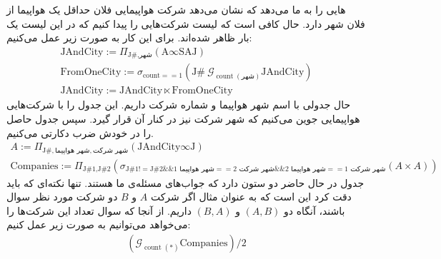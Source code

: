 \begin{enumerate}
    هایی
    را به ما می‌دهد که نشان می‌دهد شرکت هواپیمایی فلان حداقل یک هواپیما از فلان شهر دارد.
    حال کافی است که لیست شرکت‌هایی را پیدا کنیم که در این لیست یک بار ظاهر شده‌اند.
    برای این کار به صورت زیر عمل می‌کنیم:
    \begin{gather*}
        \text{JAndCity} := \Pi_{\text{J\#}, \text{شهر}} (\text{A} \infty \text{SAJ})\\
        \text{FromOneCity} := \sigma_{\text{count} == 1} (\text{J\#} ~ \mathcal{G}_{\operatorname{count}(\text{شهر})} \text{JAndCity})\\
        \text{JAndCity} := \text{JAndCity} \ltimes \text{FromOneCity}
    \end{gather*}
    حال جدولی با اسم شهر هواپیما و شماره شرکت داریم. این جدول را با شرکت‌هایی هواپیمایی جوین می‌کنیم که شهر
    شرکت نیز در کنار آن قرار گیرد. سپس جدول حاصل را در خودش ضرب دکارتی می‌کنیم.
    \begin{gather*}
        A := \Pi_{\text{J\#}, \text{شهر هواپیما}, \text{شهر شرکت}} (\text{JAndCity} \infty \text{J})\\
        \text{Companies} := \Pi_{\text{J\#1}, \text{J\#2}} (\sigma_{\text{J\#1} != \text{J\#2} \&\& \text{شهر هواپیما 1} == \text{شهر شرکت 2} \&\& \text{شهر هواپیما 2} == \text{شهر شرکت 1}} (A \times A))
    \end{gather*}
    جدول
    در حال حاضر دو ستون دارد که جواب‌های مسئله‌ی ما هستند. تنها نکته‌ای که باید دقت کرد این است که به عنوان مثال
    اگر شرکت
    $A$ و $B$
    دو شرکت مورد نظر سوال باشند، آنگاه دو
    $(A, B)$ و $(B, A)$
    داریم. از آنجا که سوال تعداد این شرکت‌ها را می‌خواهد می‌توانیم به صورت زیر عمل کنیم:
    \begin{gather*}
        (\mathcal{G}_{\operatorname{count}(*)}\text{Companies}) / 2
    \end{gather*}
\end{enumerate}